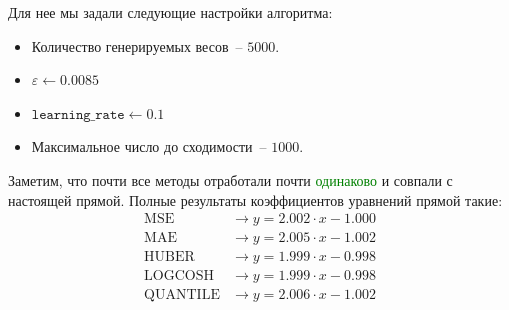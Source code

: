 \documentclass[12pt, a4paper, oneside, final]{article}
\begin{document}
	Для нее мы задали следующие настройки алгоритма:
	\begin{itemize}
		\item Количество генерируемых весов~-- $5000$.
		\item $\varepsilon \gets 0.0085$
		\item $\texttt{learning\_rate} \gets 0.1$
		\item Максимальное число до сходимости~-- $1000$.
	\end{itemize}
	Заметим, что почти все методы отработали почти \textcolor{green}{одинаково} и совпали с настоящей прямой.
	Полные результаты коэффициентов уравнений прямой такие:
	\begin{align*}
		\text{MSE} &\to y = 2.002 \cdot x - 1.000 \\
		\text{MAE} &\to y = 2.005 \cdot x - 1.002 \\
		\text{HUBER} &\to y = 1.999 \cdot x - 0.998 \\
		\text{LOGCOSH} &\to y = 1.999 \cdot x - 0.998 \\
		\text{QUANTILE} &\to y = 2.006 \cdot x - 1.002
	\end{align*}
\end{document}
